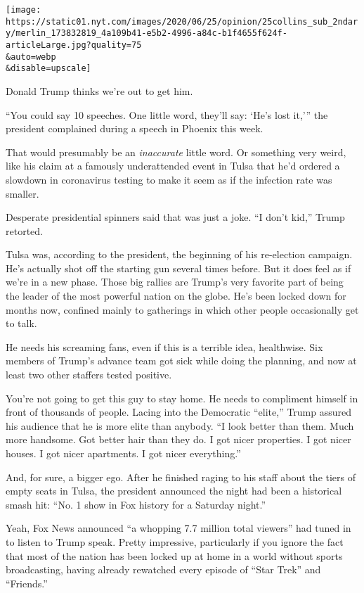 \texttt{[image: https://static01.nyt.com/images/2020/06/25/opinion/25collins\_sub\_2ndary/merlin\_173832819\_4a109b41-e5b2-4996-a84c-b1f4655f624f-articleLarge.jpg?quality=75\\\&auto=webp\\\&disable=upscale]}

Donald Trump thinks we're out to get him.

``You could say 10 speeches. One little word, they'll say: `He's lost
it,''' the president complained during a speech in Phoenix this week.

That would presumably be an \emph{inaccurate} little word. Or something
very weird, like his claim at a famously underattended event in Tulsa
that he'd ordered a slowdown in coronavirus testing to make it seem as
if the infection rate was smaller.

Desperate presidential spinners said that was just a joke. ``I don't
kid,'' Trump retorted.

Tulsa was, according to the president, the beginning of his re-election
campaign. He's actually shot off the starting gun several times before.
But it does feel as if we're in a new phase. Those big rallies are
Trump's very favorite part of being the leader of the most powerful
nation on the globe. He's been locked down for months now, confined
mainly to gatherings in which other people occasionally get to talk.

He needs his screaming fans, even if this is a terrible idea,
healthwise. Six members of Trump's advance team got sick while doing the
planning, and now at least two other staffers tested positive.

You're not going to get this guy to stay home. He needs to compliment
himself in front of thousands of people. Lacing into the Democratic
``elite,'' Trump assured his audience that he is more elite than
anybody. ``I look better than them. Much more handsome. Got better hair
than they do. I got nicer properties. I got nicer houses. I got nicer
apartments. I got nicer everything.''

And, for sure, a bigger ego. After he finished raging to his staff about
the tiers of empty seats in Tulsa, the president announced the night had
been a historical smash hit: ``No. 1 show in Fox history for a Saturday
night.''

Yeah, Fox News announced ``a whopping 7.7 million total viewers'' had
tuned in to listen to Trump speak. Pretty impressive, particularly if
you ignore the fact that most of the nation has been locked up at home
in a world without sports broadcasting, having already rewatched every
episode of ``Star Trek'' and ``Friends.''

